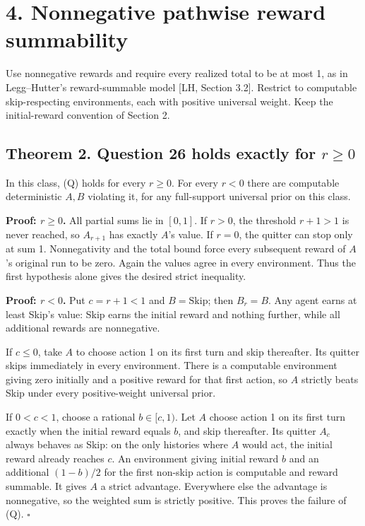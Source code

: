 \documentclass[
  11pt,
  letterpaper,
]{article}
\begin{document}
\section{4. Nonnegative pathwise reward
summability}\label{nonnegative-pathwise-reward-summability}

Use nonnegative rewards and require every realized total to be at most
1, as in Legg--Hutter's reward-summable model {[}LH, Section 3.2{]}.
Restrict to computable skip-respecting environments, each with positive
universal weight. Keep the initial-reward convention of Section 2.

\subsection{\texorpdfstring{Theorem 2. Question 26 holds exactly for
\(r\geq0\)}{Theorem 2. Question 26 holds exactly for r\textbackslash geq0}}\label{theorem-2.-question-26-holds-exactly-for-rgeq0}

In this class, (Q) holds for every \(r\geq0\). For every \(r<0\) there
are computable deterministic \(A,B\) violating it, for any full-support
universal prior on this class.

\textbf{Proof: \(r\geq0\).} All partial sums lie in \([0,1]\). If
\(r>0\), the threshold \(r+1>1\) is never reached, so \(A_{r+1}\) has
exactly \(A\)'s value. If \(r=0\), the quitter can stop only at sum 1.
Nonnegativity and the total bound force every subsequent reward of
\(A\)'s original run to be zero. Again the values agree in every
environment. Thus the first hypothesis alone gives the desired strict
inequality.

\textbf{Proof: \(r<0\).} Put \(c=r+1<1\) and \(B=\mathrm{Skip}\); then
\(B_r=B\). Any agent earns at least Skip's value: Skip earns the initial
reward and nothing further, while all additional rewards are
nonnegative.

If \(c\leq0\), take \(A\) to choose action 1 on its first turn and skip
thereafter. Its quitter skips immediately in every environment. There is
a computable environment giving zero initially and a positive reward for
that first action, so \(A\) strictly beats Skip under every
positive-weight universal prior.

If \(0<c<1\), choose a rational \(b\in[c,1)\). Let \(A\) choose action 1
on its first turn exactly when the initial reward equals \(b\), and skip
thereafter. Its quitter \(A_c\) always behaves as Skip: on the only
histories where \(A\) would act, the initial reward already reaches
\(c\). An environment giving initial reward \(b\) and an additional
\((1-b)/2\) for the first non-skip action is computable and reward
summable. It gives \(A\) a strict advantage. Everywhere else the
advantage is nonnegative, so the weighted sum is strictly positive. This
proves the failure of (Q). \hfill\(\square\)
\end{document}
